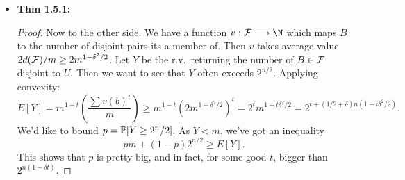 \documentclass[11pt]{article}
\newenvironment{INT}[1][]{\begin{itemize}\small\item\textbf{#1}}{\end{itemize}}
\begin{document}
\begin{itemise}
\begin{INT}[Thm 1.5.1:]
\begin{proof}
\INDENT Now to the other side. We have a function $v:\calF\to\N$ which maps $B$ to the number of disjoint pairs its a member of. Then $v$ takes average value $2d(\mathcal{F})/m\geq2m^{1-\delta^2/2}$. Let $Y$ be the r.v.\ returning the number of $B\in \mathcal{F}$ disjoint to $U$. Then we want to see that $Y$ often exceeds $2^{n/2}$. Applying convexity:
\[E[Y]=
m^{1-t}\left(\frac{\sum v(b)^t}{m}\right)\geq m^{1-t}\left(2m^{1-\delta^2/2}\right)^t=2^tm^{1-t\delta^2/2}=2^{t+(1/2+\delta)n(1-t\delta^2/2)}.\]
We'd like to bound $p=\operatorname{\mathbb{P}}[Y\geq 2^n/2]$. As $Y<m$, we've got an inequality
\[pm+(1-p)2^{n/2}\geq E[Y].\]
This shows that $p$ is pretty big, and in fact, for some good $t$, bigger than $2^{n(1-\delta t)}$.
\end{proof}
\end{INT}
\end{itemise}





\printindex
\end{document}
